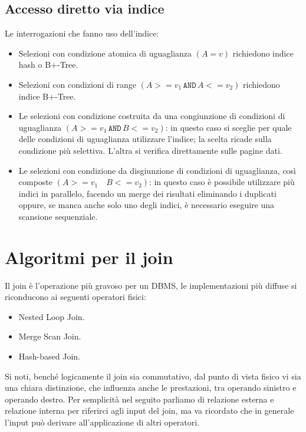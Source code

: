 \documentclass[oneside,a4paper,11pt]{book}
\theoremstyle{italicstyle}
\theoremstyle{normStyle}
\begin{document}
\subsection{Accesso diretto via indice}
Le interrogazioni che fanno uso dell'indice:
\begin{itemize}
  \item Selezioni con condizione atomica di uguaglianza $(A = v)$ richiedono indice hash o
  B+-Tree.
  \item Selezioni con condizioni di range $(A >=v_1\, \texttt{AND} \, A <=v_2)$ richiedono indice B+-Tree.
  \item Le selezioni con condizione costruita da una congiunzione di condizioni di uguaglianza $(A >=v_1\, \texttt{AND} \, B <=v_2)$:
  in questo caso si sceglie per quale delle condizioni di uguaglianza utilizzare l'indice; la 
  scelta ricade sulla condizione più selettiva. L'altra si verifica direttamente sulle pagine dati.
  \item Le selezioni con condizione da disgiunzione di condizioni di uguaglianza, così composte $(A >=v_1\, \texttt{ } \, B <=v_2)$:
  in questo caso è possibile utilizzare più indici in parallelo, facendo un merge dei risultati eliminando i duplicati oppure,
  se manca anche solo uno degli indici, è necessario eseguire una scansione sequenziale.
\end{itemize}
\section{Algoritmi per il join}
Il join è l'operazione più gravoso per un DBMS, le implementazioni più diffuse 
si riconducono ai seguenti operatori fisici:
\begin{itemize}
  \item Nested Loop Join.
  \item Merge Scan Join.
  \item Hash-based Join.
\end{itemize}
Si noti, benché logicamente il join sia commutativo, dal punto di vista fisico 
vi sia una chiara distinzione, che influenza anche le prestazioni, tra operando sinistro e operando 
destro. Per semplicità nel seguito parliamo di relazione esterna e relazione 
interna per riferirci agli input del join, ma va ricordato che in generale l'input 
può derivare all'applicazione di altri operatori.
\end{document}
